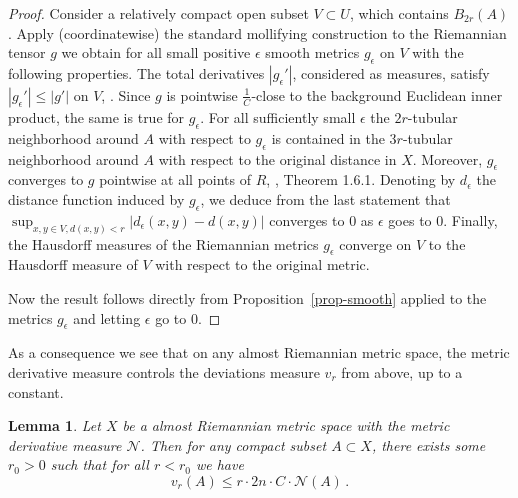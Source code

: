\documentclass[12pt,leqno]{amsart}
\numberwithin{equation}{section}
\newtheorem{lem}[thm]{Lemma}
\theoremstyle{definition}
\theoremstyle{remark}
\newcommand{\pref}[1]{Proposition~\ref{#1}}
\begin{document}
\begin{proof}
Consider a relatively compact open subset $ V \subset U$, which contains $B_{2r} (A)$.  Apply (coordinatewise) the standard mollifying construction
to the Riemannian tensor $g$ we obtain for all small positive $\epsilon$  smooth metrics $g_{\epsilon}$ on $V$ with the following properties.
The total derivatives $|g_{\epsilon} '|$, considered as measures, satisfy  $|g_{\epsilon} '|\leq |g'|$ on $V$, \cite[Theorem 5.3.1]{Ziemer}.   Since $g$ is pointwise   $\frac 1 C$-close to the background Euclidean inner product, the same is true for  $g_{\epsilon}$.  For all sufficiently small $\epsilon$ the $2r$-tubular neighborhood around $A$ with respect to $g_{\epsilon}$ is contained in the $3r$-tubular neighborhood around $A$ with respect to the original distance in $X$. Moreover, $g_{\epsilon}$ converges to $g$ pointwise at all points of $R$, \cite{Ziemer}, Theorem 1.6.1.
Denoting by $d_{\epsilon}$ the distance function induced by $g_{\epsilon}$, we deduce from the last statement that $\sup _{x,y \in V, d(x,y) <r} |d_{\epsilon} (x,y) -d(x,y)|$ converges to $0$ as $\epsilon$ goes to $0$. Finally, the Hausdorff measures of the Riemannian metrics $g_{\epsilon}$ converge on $V$ to the Hausdorff measure of $V$ with respect to the original metric.

 Now the result follows directly  from \pref{prop-smooth} applied to the metrics $g_{\epsilon}$ and letting $\epsilon$ go to $0$.
\end{proof}



As a consequence we see that on any almost Riemannian metric space, the metric derivative measure controls the deviations measure $v_r$ from above, up to a constant.





\begin{lem} \label{cor-mu-dc}
Let $X$ be a almost Riemannian metric space with the metric derivative measure $\mathcal N$.
Then for any compact subset $A\subset X$, there exists some $r_0>0$ such that for all
$r<r_0$ we have $$v_r (A) \leq r\cdot 2n\cdot C\cdot \mathcal N (A)\,. $$
\end{lem}
\end{document}
